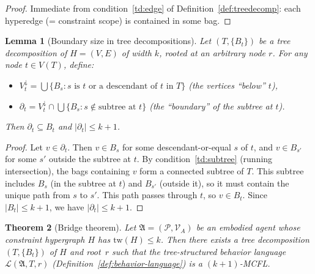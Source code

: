\documentclass[11pt,a4paper]{article}
\theoremstyle{plain}
\newtheorem{theorem}{Theorem}[section]
\newtheorem{lemma}[theorem]{Lemma}
\theoremstyle{definition}
\theoremstyle{remark}
\begin{document}
\begin{proof}
Immediate from condition~\ref{td:edge} of Definition~\ref{def:treedecomp}: each hyperedge (= constraint scope) is contained in some bag.
\end{proof}

\begin{lemma}[Boundary size in tree decompositions]\label{lem:boundary}
Let $(T, \{B_t\})$ be a tree decomposition of $H = (V,E)$ of width $k$, rooted at an arbitrary node $r$.
For any node $t \in V(T)$, define:
\begin{itemize}[nosep]
  \item $V^{\downarrow}_t = \bigcup \{B_s : s \text{ is $t$ or a descendant of $t$ in $T$}\}$ (the vertices ``below'' $t$),
  \item $\partial_t = V^{\downarrow}_t \cap \bigcup\{B_s : s \notin \text{subtree at } t\}$ (the ``boundary'' of the subtree at $t$).
\end{itemize}
Then $\partial_t \subseteq B_t$ and $|\partial_t| \leq k + 1$.
\end{lemma}

\begin{proof}
Let $v \in \partial_t$.
Then $v \in B_s$ for some descendant-or-equal $s$ of $t$, and $v \in B_{s'}$ for some $s'$ outside the subtree at $t$.
By condition~\ref{td:subtree} (running intersection), the bags containing $v$ form a connected subtree of $T$.
This subtree includes $B_s$ (in the subtree at $t$) and $B_{s'}$ (outside it), so it must contain the unique path from $s$ to $s'$.
This path passes through $t$, so $v \in B_t$.
Since $|B_t| \leq k + 1$, we have $|\partial_t| \leq k + 1$.
\end{proof}

\begin{theorem}[Bridge theorem]\label{thm:bridge}
Let $\mathfrak{A} = (\mathcal{P}, \mathcal{V}_A)$ be an embodied agent whose constraint hypergraph $H$ has $\mathrm{tw}(H) \leq k$.
Then there exists a tree decomposition $(T, \{B_t\})$ of $H$ and root~$r$ such that the tree-structured behavior language $\mathcal{L}(\mathfrak{A}, T, r)$ (Definition~\ref{def:behavior-language}) is a $(k{+}1)$-MCFL.
\end{theorem}
\end{document}
